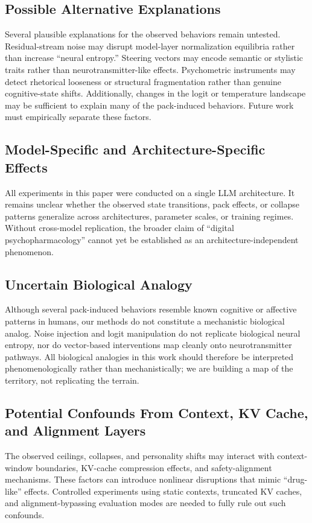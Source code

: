 \documentclass[10pt, twocolumn]{article}
\begin{document}
\subsection{Possible Alternative Explanations}
Several plausible explanations for the observed behaviors remain untested. Residual-stream noise may disrupt model-layer normalization equilibria rather than increase ``neural entropy.'' Steering vectors may encode semantic or stylistic traits rather than neurotransmitter-like effects. Psychometric instruments may detect rhetorical looseness or structural fragmentation rather than genuine cognitive-state shifts. Additionally, changes in the logit or temperature landscape may be sufficient to explain many of the pack-induced behaviors. Future work must empirically separate these factors.

\subsection{Model-Specific and Architecture-Specific Effects}
All experiments in this paper were conducted on a single LLM architecture. It remains unclear whether the observed state transitions, pack effects, or collapse patterns generalize across architectures, parameter scales, or training regimes. Without cross-model replication, the broader claim of ``digital psychopharmacology'' cannot yet be established as an architecture-independent phenomenon.

\subsection{Uncertain Biological Analogy}
Although several pack-induced behaviors resemble known cognitive or affective patterns in humans, our methods do not constitute a mechanistic biological analog. Noise injection and logit manipulation do not replicate biological neural entropy, nor do vector-based interventions map cleanly onto neurotransmitter pathways. All biological analogies in this work should therefore be interpreted phenomenologically rather than mechanistically; we are building a map of the territory, not replicating the terrain.

\subsection{Potential Confounds From Context, KV Cache, and Alignment Layers}
The observed ceilings, collapses, and personality shifts may interact with context-window boundaries, KV-cache compression effects, and safety-alignment mechanisms. These factors can introduce nonlinear disruptions that mimic ``drug-like'' effects. Controlled experiments using static contexts, truncated KV caches, and alignment-bypassing evaluation modes are needed to fully rule out such confounds.
\end{document}
